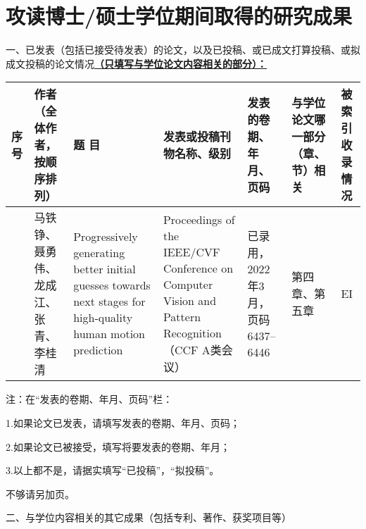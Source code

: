 \chapter{攻读博士/硕士学位期间取得的研究成果} %
\pubfont %
一、已发表（包括已接受待发表）的论文，以及已投稿、或已成文打算投稿、或拟成文投稿的论文情况\underline{\textbf{（只填写与学位论文内容相关的部分）：}}
\begin{table}
	\centering{}%
	\pubfont 
	\begin{longtable}{|>{\centering}m{0.5cm}|m{1.8cm}|>{\centering}m{2.8cm}|>{\centering}m{2.5cm}|>{\centering}m{2.2cm}|>{\centering}m{}|>{\centering}m{1cm}|}
		\hline 
		\textbf{序号} & \textbf{作者（全体作者，按顺序排列）} & \textbf{题 目} 						   & \textbf{发表或投稿刊物名称、级别} & \textbf{发表的卷期、年月、页码} & \textbf{与学位论文哪一部分（章、节）相关} &\textbf{被索引收录情况}\tabularnewline
		\hline 
		1    & 马铁铮、聂勇伟、龙成江、张青、李桂清& Progressively generating better initial guesses towards next stages for high-quality human motion prediction & Proceedings of the IEEE/CVF Conference on Computer Vision and Pattern Recognition（CCF A类会议）& 已录用，2022年3月，页码6437--6446 & 第四章、第五章 & EI\tabularnewline
		\hline 
	\end{longtable}
\end{table}

注：在“发表的卷期、年月、页码”栏：

1.如果论文已发表，请填写发表的卷期、年月、页码；

2.如果论文已被接受，填写将要发表的卷期、年月；

3.以上都不是，请据实填写“已投稿”，“拟投稿”。

不够请另加页。

二、与学位内容相关的其它成果（包括专利、著作、获奖项目等）




\normalsize %